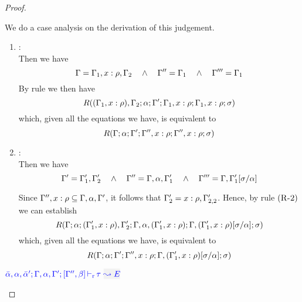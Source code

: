\begin{proof}
\begin{description}
  We do a case analysis on the derivation of this judgement.
  \begin{enumerate}
  \item {}: \\ Then we have
\begin{equation*}
  \Gamma = \Gamma_1,x:\rho,\Gamma_2  \quad\wedge\quad \Gamma'' = \Gamma_1 \quad\wedge\quad \Gamma''' = \Gamma_1
\end{equation*}
       By rule  we then have
\begin{equation*}
R((\Gamma_1,x:\rho),\Gamma_2;\alpha;\Gamma';\Gamma_1,x:\rho;\Gamma_1,x:\rho;\sigma)
\end{equation*}
        which, given all the equations we have, is equivalent to
\begin{equation*}
R(\Gamma;\alpha;\Gamma';\Gamma'',x:\rho;\Gamma'',x:\rho;\sigma)
\end{equation*}

  \item {}: \\
   Then we have
\begin{equation*}
  \Gamma' = \Gamma_1',\Gamma_2' \quad\wedge\quad \Gamma'' = \Gamma,\alpha,\Gamma_1' \quad\wedge\quad
      \Gamma''' = \Gamma,\Gamma_1'[\sigma/\alpha]
\end{equation*}

  Since $\Gamma'',x:\rho \subseteq \Gamma,\alpha,\Gamma'$, it follows that $\Gamma_2' = x:\rho,\Gamma_{2,2}'$.
  Hence, by rule $\mbox{({\tt\sc R-2})}$ we can establish
\begin{equation*}
R(\Gamma;\alpha;(\Gamma_1',x:\rho),\Gamma_2';\Gamma,\alpha,(\Gamma_1',x:\rho);\Gamma,(\Gamma_1',x:\rho)[\sigma/\alpha];\sigma)
\end{equation*}
        which, given all the equations we have, is equivalent to
\begin{equation*}
R(\Gamma;\alpha;\Gamma';\Gamma'',x:\rho;\Gamma,(\Gamma_1',x:\rho)[\sigma/\alpha];\sigma)
\end{equation*}
  \end{enumerate}

\item[\fbox{\rref{L-TyVar}}]\quad$\dlres{\bar{\alpha},\alpha,\bar{\alpha}'}{\tenv,\alpha,\tenv'}{\tenv'',\beta}{\type}{E}$\\


\end{description}
\end{proof}
